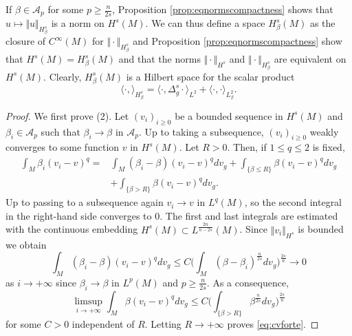 \documentclass[10pt]{amsart}
\numberwithin{equation}{section}
\theoremstyle{plain}
\theoremstyle{remark}
\begin{document}
If $\beta \in \mathcal{A}_p$ for some $p \ge \frac{n}{2s}$, Proposition \ref{prop:eqnormscompactness} shows that $u \mapsto \Vert u \Vert_{H^s_{\beta}}$ is a norm on $H^s(M)$. We can thus  define a space $H^s_{\beta}(M)$ as the closure of $C^\infty(M)$ for $\Vert \cdot \Vert_{H^s_\beta}$ and Proposition  \ref{prop:eqnormscompactness} show that $H^s(M) = H^s_\beta(M)$ and that the norms $\Vert \cdot \Vert_{H^s}$ and $\Vert \cdot \Vert_{H^s_\beta}$ are equivalent on $H^s(M)$. Clearly, $H^s_\beta(M)$ is a Hilbert space for the scalar product  
$$\langle \cdot,\rangle_{H^s_\beta}=\langle \cdot , \Delta_g^s \cdot \rangle_{L^2} + \langle \cdot ,  \cdot \rangle_{L^2_\beta} .$$


\begin{proof}
We first prove (2). Let $(v_i)_{i\geq 0}$ be a bounded sequence in $H^s(M)$ and $\beta_i \in \mathcal{A}_p$ such that $\beta_i \to \beta$ in $\mathcal{A}_p$. Up to taking a subsequence, $(v_i)_{i\geq 0}$ weakly converges to some function $v$ in $H^s(M)$. Let $R>0$. Then, if $1 \le q \le 2$ is fixed,
$$ \begin{aligned}
\int_M \beta_i(v_i-v)^q = & \int_{M} \left(\beta_i-\beta\right) (v_i - v)^qdv_g + \int_{\{\beta \le R \}} \beta(v_i - v)^qdv_g \\
&+ \int_{\{ \beta>R\}} \beta(v_i - v)^qdv_g.
\end{aligned} $$
Up to passing to a subsequence again $v_i \to v$ in $L^q(M)$, so the second integral in the right-hand side converges to $0$. The first and last integrals are estimated with the continuous embedding $H^s(M) \subset L^{\frac{2n}{n-2s}}(M)$. Since $\Vert v_i \Vert_{H^s} $ is bounded we obtain
$$ \int_{M} \left(\beta_i-\beta\right) (v_i - v)^qdv_g \leq C \Big( \int_{ M } (\beta-\beta_i)^{\frac{n}{2s}}dv_g \Big)^{\frac{2s}{n}} \to 0 $$
as $i \to + \infty$ since $\beta_i \to \beta$ in $L^p(M)$ and $p \ge \frac{n}{2s}$. As a consequence, %
$$ \limsup_{i \to + \infty}\int_{M} \beta(v_i - v)^qdv_g \le C \Big( \int_{\{ \beta >R\}} \beta^{\frac{n}{2s}}dv_g \Big)^{\frac{2s}{n}} $$
for some $C>0$ independent of $R$. Letting $R \to + \infty$ proves \eqref{eq:cvforte}.

\medskip


\end{proof}
\end{document}
